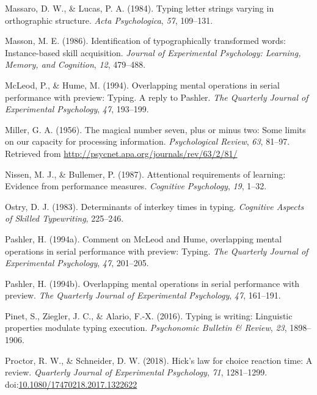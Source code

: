 \documentclass[,man,floatsintext]{apa6}
\begin{document}
\leavevmode\hypertarget{ref-massaro_typing_1984}{}%
Massaro, D. W., \& Lucas, P. A. (1984). Typing letter strings varying in orthographic structure. \emph{Acta Psychologica}, \emph{57}, 109--131.

\leavevmode\hypertarget{ref-MassonIdentificationtypographicallytransformed1986}{}%
Masson, M. E. (1986). Identification of typographically transformed words: Instance-based skill acquisition. \emph{Journal of Experimental Psychology: Learning, Memory, and Cognition}, \emph{12}, 479--488.

\leavevmode\hypertarget{ref-mcleod_overlapping_1994}{}%
McLeod, P., \& Hume, M. (1994). Overlapping mental operations in serial performance with preview: Typing. A reply to Pashler. \emph{The Quarterly Journal of Experimental Psychology}, \emph{47}, 193--199.

\leavevmode\hypertarget{ref-miller_magical_1956}{}%
Miller, G. A. (1956). The magical number seven, plus or minus two: Some limits on our capacity for processing information. \emph{Psychological Review}, \emph{63}, 81--97. Retrieved from \url{http://psycnet.apa.org/journals/rev/63/2/81/}

\leavevmode\hypertarget{ref-NissenAttentionalrequirementslearning1987}{}%
Nissen, M. J., \& Bullemer, P. (1987). Attentional requirements of learning: Evidence from performance measures. \emph{Cognitive Psychology}, \emph{19}, 1--32.

\leavevmode\hypertarget{ref-OstryDeterminantsinterkeytimes1983}{}%
Ostry, D. J. (1983). Determinants of interkey times in typing. \emph{Cognitive Aspects of Skilled Typewriting}, 225--246.

\leavevmode\hypertarget{ref-pashler_comment_1994}{}%
Pashler, H. (1994a). Comment on McLeod and Hume, overlapping mental operations in serial performance with preview: Typing. \emph{The Quarterly Journal of Experimental Psychology}, \emph{47}, 201--205.

\leavevmode\hypertarget{ref-pashler_overlapping_1994}{}%
Pashler, H. (1994b). Overlapping mental operations in serial performance with preview. \emph{The Quarterly Journal of Experimental Psychology}, \emph{47}, 161--191.

\leavevmode\hypertarget{ref-PinetTypingwritingLinguistic2016}{}%
Pinet, S., Ziegler, J. C., \& Alario, F.-X. (2016). Typing is writing: Linguistic properties modulate typing execution. \emph{Psychonomic Bulletin \& Review}, \emph{23}, 1898--1906.

\leavevmode\hypertarget{ref-proctor_hicks_2018}{}%
Proctor, R. W., \& Schneider, D. W. (2018). Hick's law for choice reaction time: A review. \emph{Quarterly Journal of Experimental Psychology}, \emph{71}, 1281--1299. doi:\href{https://doi.org/10.1080/17470218.2017.1322622}{10.1080/17470218.2017.1322622}
\end{document}
